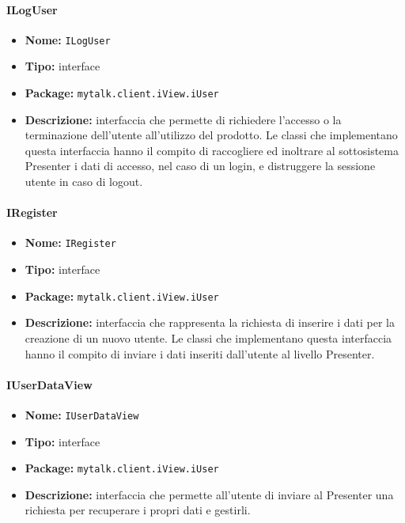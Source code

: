{{\paragraph{ILogUser}{
	\begin{itemize}
		\item [] \textbf{Nome:} \texttt{ILogUser}
		\item [] \textbf{Tipo:} interface
		\item [] \textbf{Package:} \texttt{mytalk.client.iView.iUser}
		\item [] \textbf{Descrizione:}{ interfaccia che permette di richiedere l'accesso o la terminazione dell'utente all'utilizzo del prodotto. Le classi che implementano questa interfaccia hanno il compito di raccogliere ed inoltrare al sottosistema Presenter i dati di accesso, nel caso di un login, e distruggere la sessione utente in caso di logout.}
	\end{itemize}
}
\paragraph{IRegister}{
	\begin{itemize}
		\item [] \textbf{Nome:} \texttt{IRegister}
		\item [] \textbf{Tipo:} interface
		\item [] \textbf{Package:} \texttt{mytalk.client.iView.iUser}
		\item [] \textbf{Descrizione:}{ interfaccia che rappresenta la richiesta di inserire i dati per la creazione di un nuovo utente. Le classi che implementano questa interfaccia hanno il compito di inviare i dati inseriti dall'utente al livello Presenter.}
	\end{itemize}
}
\paragraph{IUserDataView}{
	\begin{itemize}
		\item [] \textbf{Nome:} \texttt{IUserDataView}
		\item [] \textbf{Tipo:} interface
		\item [] \textbf{Package:} \texttt{mytalk.client.iView.iUser}
		\item [] \textbf{Descrizione:}{ interfaccia che permette all'utente di inviare al Presenter una richiesta per recuperare i propri dati e gestirli.}
	\end{itemize}
}
}}
